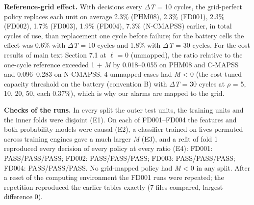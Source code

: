 \documentclass[11pt,a4paper]{article}
\begin{document}
\noindent \textbf{Reference-grid effect.} With decisions every $\Delta$\textit{T} = 10 cycles, the grid-perfect policy replaces each unit on average 2.3\% (PHM08), 2.3\% (FD001), 2.3\% (FD002), 1.7\% (FD003), 1.9\% (FD004), 7.3\% (N-CMAPSS) earlier, in total cycles of use, than replacement one cycle before failure; for the battery cells the effect was 0.6\% with $\Delta$\textit{T} = 10 cycles and 1.8\% with $\Delta$\textit{T} = 30 cycles. For the cost results of main text Section 7.1 at $\ell$ = 0 (unmapped), the ratio relative to the one-cycle reference exceeded 1 + \textit{M} by 0.018--0.055 on PHM08 and C-MAPSS and 0.096--0.283 on N-CMAPSS. 4 unmapped cases had \textit{M} < 0 (the cost-tuned capacity threshold on the battery (convention B) with $\Delta$\textit{T} = 30 cycles at $\rho$ = 5, 10, 20, 50, each \textminus{}0.37\%), which is why our alarms are mapped to the grid.

\noindent \textbf{Checks of the runs.} In every split the outer test units, the training units and the inner folds were disjoint (E1). On each of FD001--FD004 the features and both probability models were causal (E2), a classifier trained on lives permuted across training engines gave a much larger \textit{M} (E3), and a refit of fold 1 reproduced every decision of every policy at every ratio (E4): FD001: PASS/PASS/PASS; FD002: PASS/PASS/PASS; FD003: PASS/PASS/PASS; FD004: PASS/PASS/PASS. No grid-mapped policy had \textit{M} < 0 in any split. After a reset of the computing environment the FD001 runs were repeated; the repetition reproduced the earlier tables exactly (7 files compared, largest difference 0).
\end{document}
